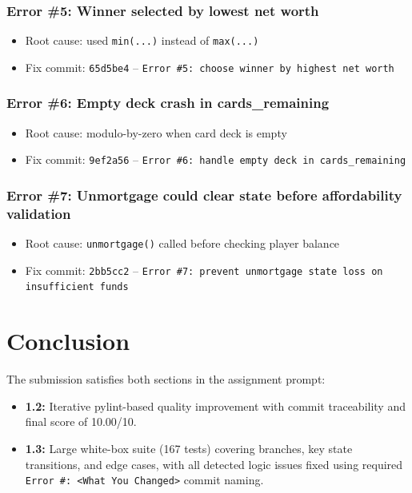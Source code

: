 \documentclass[11pt,a4paper]{article}
\begin{document}
\subsubsection*{Error \#5: Winner selected by lowest net worth}
\begin{itemize}
  \item Root cause: used \texttt{min(...)} instead of \texttt{max(...)}
  \item Fix commit: \texttt{65d5be4} -- \texttt{Error \#5: choose winner by highest net worth}
\end{itemize}

\subsubsection*{Error \#6: Empty deck crash in cards\_remaining}
\begin{itemize}
  \item Root cause: modulo-by-zero when card deck is empty
  \item Fix commit: \texttt{9ef2a56} -- \texttt{Error \#6: handle empty deck in cards\_remaining}
\end{itemize}

\subsubsection*{Error \#7: Unmortgage could clear state before affordability validation}
\begin{itemize}
  \item Root cause: \texttt{unmortgage()} called before checking player balance
  \item Fix commit: \texttt{2bb5cc2} -- \texttt{Error \#7: prevent unmortgage state loss on insufficient funds}
\end{itemize}

\section*{Conclusion}
The submission satisfies both sections in the assignment prompt:
\begin{itemize}
  \item \textbf{1.2:} Iterative pylint-based quality improvement with commit traceability and final score of 10.00/10.
  \item \textbf{1.3:} Large white-box suite (167 tests) covering branches, key state transitions, and edge cases, with all detected logic issues fixed using required \texttt{Error \#: <What You Changed>} commit naming.
\end{itemize}
\end{document}
